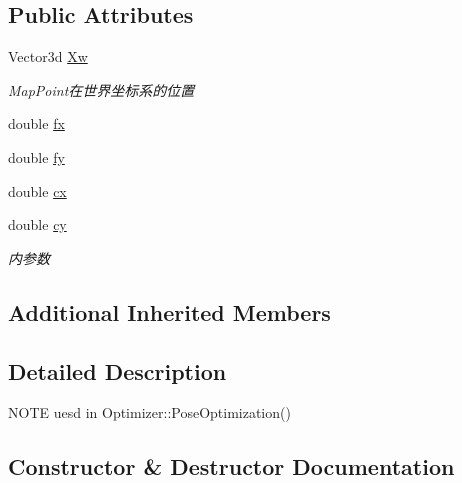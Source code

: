 \subsection*{Public Attributes}
\begin{DoxyCompactItemize}
\item 
Vector3d \mbox{\hyperlink{classg2o_1_1_edge_s_e3_project_x_y_z_only_pose_a66318605e8e9c2276b100cf73e718ea8}{Xw}}
\begin{DoxyCompactList}\small\item\em Map\+Point在世界坐标系的位置 \end{DoxyCompactList}\item 
double \mbox{\hyperlink{classg2o_1_1_edge_s_e3_project_x_y_z_only_pose_a413ca1179697e29d5476f582d2b29ff6}{fx}}
\item 
double \mbox{\hyperlink{classg2o_1_1_edge_s_e3_project_x_y_z_only_pose_a2f645f770962dc9d8c4862c0c6dbb497}{fy}}
\item 
double \mbox{\hyperlink{classg2o_1_1_edge_s_e3_project_x_y_z_only_pose_ab4d7078a2d9a628afd6022c983843904}{cx}}
\item 
double \mbox{\hyperlink{classg2o_1_1_edge_s_e3_project_x_y_z_only_pose_aa6f6f24382d0f9b03d6ae47747e6d95d}{cy}}
\begin{DoxyCompactList}\small\item\em 内参数 \end{DoxyCompactList}\end{DoxyCompactItemize}
\subsection*{Additional Inherited Members}


\subsection{Detailed Description}
N\+O\+TE uesd in Optimizer\+::\+Pose\+Optimization() 

\subsection{Constructor \& Destructor Documentation}
\mbox{\label{classg2o_1_1_edge_s_e3_project_x_y_z_only_pose_a617972556497ab31cc745f6d3eb59c58}} 
